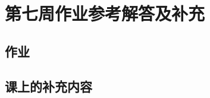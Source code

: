 \documentclass{../solutions-cn}
\begin{document}
\section*{第七周作业参考解答及补充}

\subsection*{作业}

\subsection*{课上的补充内容}
\end{document}
